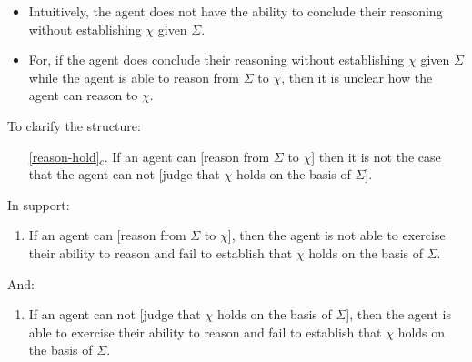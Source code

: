 \documentclass[10pt]{article}
\newcommand{\hozlinedash}[0]{%
  \noindent\hdashrule[0.5ex][c]{\textwidth}{.1pt}{2.5pt}
}
\begin{document}
\begin{itemize}
\item Intuitively, the agent does not have the ability to conclude their reasoning without establishing \(\chi\) given \(\Sigma\).
\item For, if the agent does conclude their reasoning without establishing \(\chi\) given \(\Sigma\) while the agent is able to reason from \(\Sigma\) to \(\chi\), then it is unclear how the agent can reason to \(\chi\).
\end{itemize}



To clarify the structure:

\begin{enumerate}
\item[\ref{reason-hold}\(_{c}\).] If an agent can [reason from \(\Sigma\) to \(\chi\)] then it is not the case that the agent can not [judge that \(\chi\) holds on the basis of \(\Sigma\)].
\end{enumerate}

\hozlinedash

In support:

\begin{enumerate}[label=R\arabic*., ref=R\arabic*.]
\item\label{r:1} If an agent can [reason from \(\Sigma\) to \(\chi\)], then the agent is not able to exercise their ability to reason and fail to establish that \(\chi\) holds on the basis of \(\Sigma\).
\end{enumerate}

And:

\begin{enumerate}[label=R\arabic*., ref=R\arabic*., resume]
\item\label{r:2} If an agent can not [judge that \(\chi\) holds on the basis of \(\Sigma\)], then the agent is able to exercise their ability to reason and fail to establish that \(\chi\) holds on the basis of \(\Sigma\).
\end{enumerate}
\end{document}
